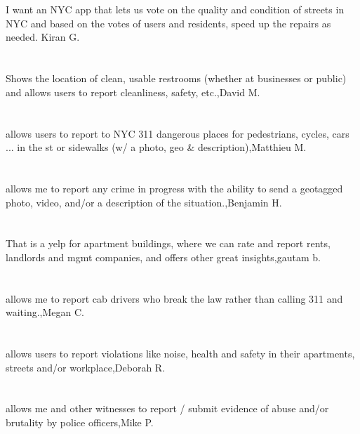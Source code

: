 \section{} I want an NYC app that lets us vote on the quality and condition of streets in NYC and based on the votes of users and residents, speed up the repairs as needed.  Kiran G.
\section{}Shows the location of clean, usable restrooms (whether at businesses or public) and allows users to report cleanliness, safety, etc.,David M.
\section{}allows users to report to NYC 311 dangerous places for pedestrians, cycles, cars ... in the st or sidewalks (w/ a photo, geo \& description),Matthieu M.	
\section{} allows me to report any crime in progress with the ability to send a geotagged photo, video, and/or a description of the situation.,Benjamin H.	
\section{}That is a yelp for apartment buildings, where we can rate and report rents, landlords and mgmt companies, and offers other great insights,gautam b.	
\section{}allows me to report cab drivers who break the law rather than calling 311 and waiting.,Megan C.	
\section{}allows users to report violations like noise, health and safety in their apartments, streets and/or workplace,Deborah R.	
\section{}allows me and other witnesses to report / submit evidence of abuse and/or brutality by police officers,Mike P.	
